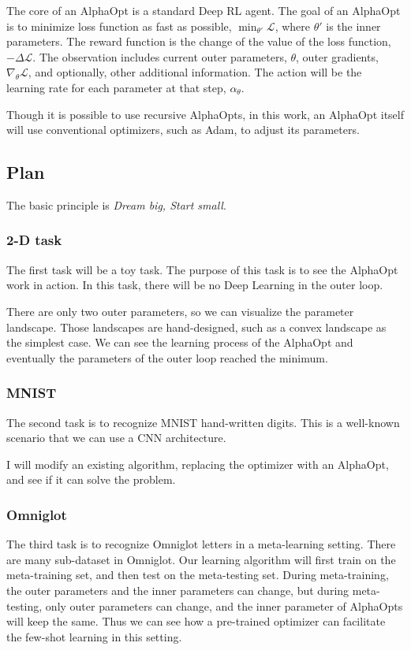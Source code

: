 The core of an AlphaOpt is a standard Deep RL agent.
The goal of an AlphaOpt is to minimize loss function as fast as possible, $\min_{\theta'} \mathcal{L}$, where $\theta'$ is the inner parameters.
The reward function is the change of the value of the loss function, $-\Delta \mathcal{L}$.
The observation includes current outer parameters, $\theta$, outer gradients, $\nabla_{\theta} \mathcal{L}$, and optionally, other additional information.
The action will be the learning rate for each parameter at that step, $\alpha_\theta$.

Though it is possible to use recursive AlphaOpts, in this work, an AlphaOpt itself will use conventional optimizers, such as Adam, to adjust its parameters.

\subsection{Plan}
The basic principle is \emph{Dream big, Start small}.

\subsubsection{2-D task}
The first task will be a toy task. The purpose of this task is to see the AlphaOpt work in action.
In this task, there will be no Deep Learning in the outer loop.

There are only two outer parameters, so we can visualize the parameter landscape. 
Those landscapes are hand-designed, such as a convex landscape as the simplest case.
We can see the learning process of the AlphaOpt and eventually the parameters of the outer loop reached the minimum.

\subsubsection{MNIST}
The second task is to recognize MNIST hand-written digits.
This is a well-known scenario that we can use a CNN architecture.

I will modify an existing algorithm, replacing the optimizer with an AlphaOpt, and see if it can solve the problem.

\subsubsection{Omniglot}
The third task is to recognize Omniglot letters in a meta-learning setting.
There are many sub-dataset in Omniglot. Our learning algorithm will first train on the meta-training set, and then test on the meta-testing set.
During meta-training, the outer parameters and the inner parameters can change, but during meta-testing, only outer parameters can change, and the inner parameter of AlphaOpts will keep the same.
Thus we can see how a pre-trained optimizer can facilitate the few-shot learning in this setting.

